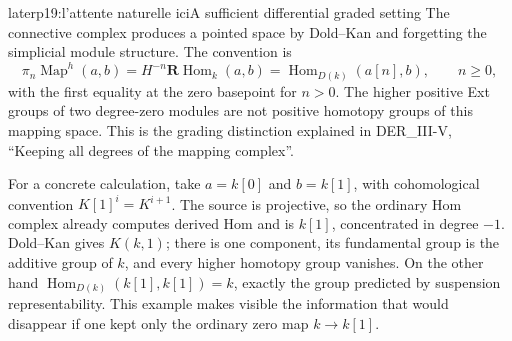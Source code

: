 \begin{dcomment}{later}{p19:l'attente naturelle ici}{A sufficient differential graded setting}
The connective complex produces a pointed space by Dold--Kan and forgetting the simplicial module structure. The convention is
\[
 \pi_n\operatorname{Map}^{h}(a,b)
   =H^{-n}\mathbf R\operatorname{Hom}_k(a,b)
   =\operatorname{Hom}_{D(k)}(a[n],b),\qquad n\geq0,
\]
with the first equality at the zero basepoint for $n>0$. The higher positive Ext groups of two degree-zero modules are not positive homotopy groups of this mapping space. This is the grading distinction explained in DER\_III-V, ``Keeping all degrees of the mapping complex''.

For a concrete calculation, take $a=k[0]$ and $b=k[1]$, with cohomological convention $K[1]^i=K^{i+1}$. The source is projective, so the ordinary Hom complex already computes derived Hom and is $k[1]$, concentrated in degree $-1$. Dold--Kan gives $K(k,1)$; there is one component, its fundamental group is the additive group of $k$, and every higher homotopy group vanishes. On the other hand $\operatorname{Hom}_{D(k)}(k[1],k[1])=k$, exactly the group predicted by suspension representability. This example makes visible the information that would disappear if one kept only the ordinary zero map $k\to k[1]$.
\end{dcomment}

